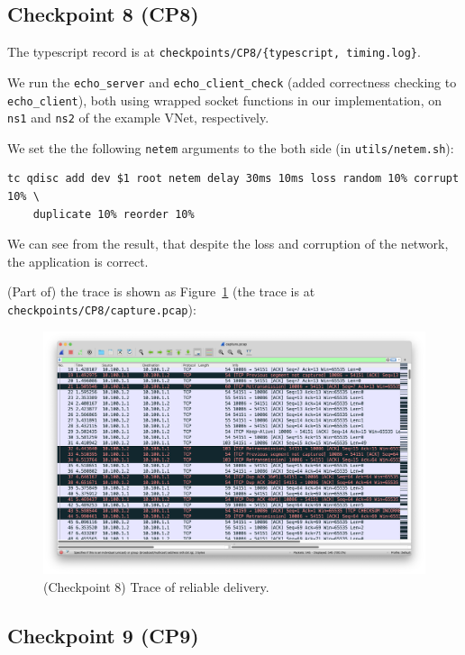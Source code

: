 \documentclass[a4paper]{article}
\begin{document}
  \subsection{Checkpoint 8 (CP8)}

  The typescript record is at \texttt{checkpoints/CP8/\{typescript, timing.log\}}.

  We run the \texttt{echo\_server} and \texttt{echo\_client\_check} (added correctness checking to \texttt{echo\_client}), both using wrapped socket functions in our implementation, on \texttt{ns1} and \texttt{ns2} of the example VNet, respectively.

  We set the the following \texttt{netem} arguments to the both side (in \texttt{utils/netem.sh}):
  \begin{verbatim}
tc qdisc add dev $1 root netem delay 30ms 10ms loss random 10% corrupt 10% \
    duplicate 10% reorder 10%
  \end{verbatim}

  We can see from the result, that despite the loss and corruption of the network, the application is correct.

  (Part of) the trace is shown as Figure~\ref{fig:CP8} (the trace is at \texttt{checkpoints/CP8/capture.pcap}):

  \begin{figure}
    \includegraphics[width=\textwidth]{resources/CP8.png}
    \caption{(Checkpoint 8) Trace of reliable delivery.} \label{fig:CP8}
  \end{figure}

  \subsection{Checkpoint 9 (CP9)}
\end{document}
